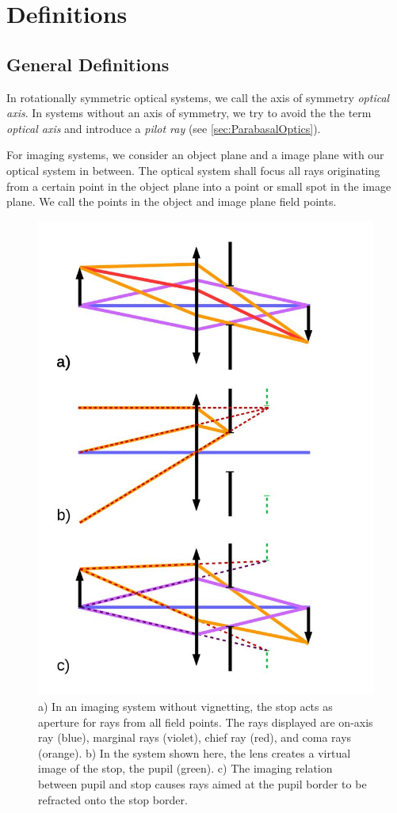 \documentclass[12pt,a4paper,twoside,openright,BCOR10mm,headsepline,titlepage,abstracton,chapterprefix,final]{scrreprt}
\begin{document}
\section{Definitions}

\subsection{General Definitions}
In rotationally symmetric optical systems, we call the axis of symmetry \emph{optical axis}. 
In systems without an axis of symmetry, we try to avoid the the term \emph{optical axis}
and introduce a \emph{pilot ray} (see \ref{sec:ParabasalOptics}).

For imaging systems, we consider an object plane and a image plane with our optical system in between. 
The optical system shall focus all rays originating from a certain point in the object plane into a point or small spot in the image plane.
We call the points in the object and image plane field points.

\begin{figure}
  \centering
   \includegraphics[width=0.5\columnwidth]{pupil}
  \caption{a) In an imaging system without vignetting, the stop acts as aperture for rays from all field points. The rays displayed are on-axis ray (blue), marginal rays (violet), chief ray (red), and coma rays (orange).
  b) In the system shown here, the lens creates a virtual image of the stop, the pupil (green).
  c) The imaging relation between pupil and stop causes rays aimed at the pupil border to be refracted onto the stop border.
  }
  \label{fig:pupil}
\end{figure}
\end{document}
